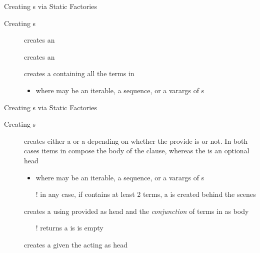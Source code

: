 \documentclass[handout]{beamer}
\begin{document}
\begin{frame}[allowframebreaks]{Creating s via Static Factories}
    \framebreak

    \begin{block}{Creating s}
        \begin{description}
            \item[] creates an 

            \item[] creates an 

            \item[] creates a  containing all the terms in 
            \begin{itemize}\small
                \item where  may be an iterable, a sequence, or a varargs of s
            \end{itemize}
        \end{description}
    \end{block}
\end{frame}

\begin{frame}[allowframebreaks]{Creating s via Static Factories}
    \begin{block}{Creating s}
        \begin{description}
            \item[] creates either a  or a  depending on whether the provide  is  or not. In both cases items in  compose the body of the clause, whereas the  is an optional head
            \begin{itemize}\small
                \item where  may be an iterable, a sequence, or a varargs of s
                \item[!] in any case, if  contains at least 2 terms, a  is created behind the scenes
            \end{itemize}

            \item[] creates a  using provided  as head and the \emph{conjunction} of terms in  as body
            \begin{itemize}\small
                \item[!] returns a  is  is empty
            \end{itemize}

            \item[] creates a  given the  acting as head
        \end{description}
    \end{block}
\end{frame}
\end{document}
